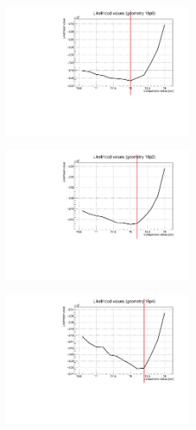 \documentclass[a4paper, 11pt]{report}
\begin{document}
\begin{figure}[htbp]
\begin{minipage}[b]{.32\textwidth}
\includegraphics[width=6cm, height=4.6cm]{figs/likelihood100LowStat/likelihood18p0.pdf}
\end{minipage}\hfill
\begin{minipage}[b]{.32\textwidth}
\includegraphics[width=6cm, height=4.6cm]{figs/likelihood100LowStat/likelihood18p2.pdf}
\end{minipage} \hfill
\begin{minipage}[b]{.32\textwidth}
\includegraphics[width=6cm, height=4.6cm]{figs/likelihood100LowStat/likelihood18p4.pdf}
\end{minipage} \hfill \vspace{10pt}


\end{figure}
\end{document}
